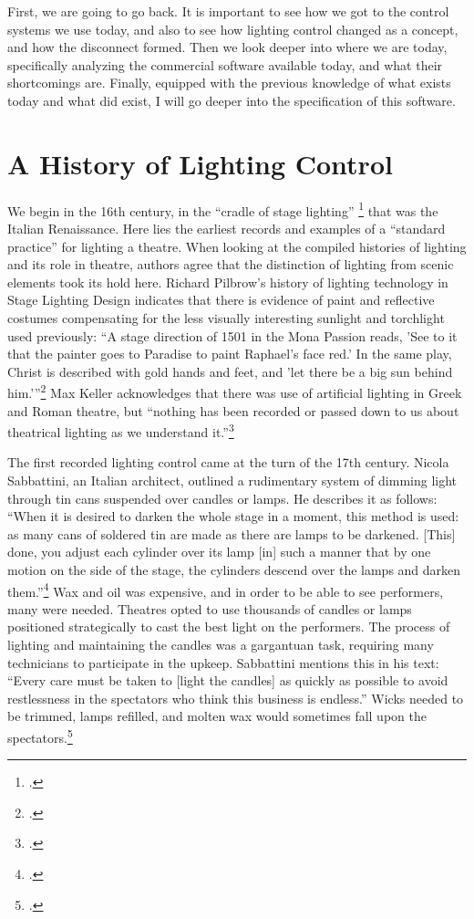 \documentclass[
    12pt,
    twoside,
    bibstyle=chicago,
    headerstyle=uppercase,
	bibfile=biblatex_updating.bib
]{reedthesis}
\begin{document}
First, we are going to go back. It is important to see how we got to the control systems we use today, and also to see how lighting control changed as a concept, and how the disconnect formed. Then we look deeper into where we are today, specifically analyzing the commercial software available today, and what their shortcomings are. Finally, equipped with the previous knowledge of what exists today and what did exist, I will go deeper into the specification of this software.


\section{A History of Lighting Control}
We begin in the 16th century, in the “cradle of stage lighting” \footcite[p. 163]{pilbrowStageLightingDesign1997} that was the Italian Renaissance. Here lies the earliest records and examples of a “standard practice” for lighting a theatre. When looking at the compiled histories of lighting and its role in theatre, authors agree that the distinction of lighting from scenic elements took its hold here. Richard Pilbrow's history of lighting technology in Stage Lighting Design indicates that there is evidence of paint and reflective costumes compensating for the less visually interesting sunlight and torchlight used previously: “A stage direction of 1501 in the Mona Passion reads, 'See to it that the painter goes to Paradise to paint Raphael's face red.' In the same play, Christ is described with gold hands and feet, and 'let there be a big sun behind him.'”\footcite[p. 166-167]{pilbrowStageLightingDesign1997} Max Keller acknowledges that there was use of artificial lighting in Greek and Roman theatre, but “nothing has been recorded or passed down to us about theatrical lighting as we understand it.”\footcite[p. 33]{kellerLightFantasticArt2006}

The first recorded lighting control came at the turn of the 17th century. Nicola Sabbattini, an Italian architect, outlined a rudimentary system of dimming light through tin cans suspended over candles or lamps. He describes it as follows: “When it is desired to darken the whole stage in a moment, this method is used: as many cans of soldered tin are made as there are lamps to be darkened. [This] done, you adjust each cylinder over its lamp [in] such a manner that by one motion on the side of the stage, the cylinders descend over the lamps and darken them.”\footcite[p. 111-112]{hewittRenaissanceStageDocuments1958} Wax and oil was expensive, and in order to be able to see performers, many were needed. Theatres opted to use thousands of candles or lamps positioned strategically to cast the best light on the performers. The process of lighting and maintaining the candles was a gargantuan task, requiring many technicians to participate in the upkeep. Sabbattini mentions this in his text: “Every care must be taken to [light the candles] as quickly as possible to avoid restlessness in the spectators who think this business is endless.” Wicks needed to be trimmed, lamps refilled, and molten wax would sometimes fall upon the spectators.\footcite[p. 97]{hewittRenaissanceStageDocuments1958}
\end{document}
